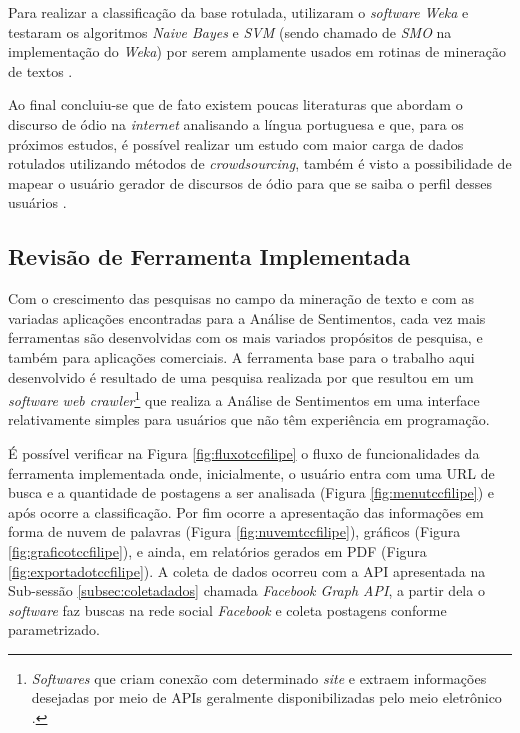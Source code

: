 Para realizar a classificação da base rotulada,  utilizaram o \textit{software} \textit{Weka} e testaram os algoritmos \textit{Naive Bayes} e \textit{SVM} (sendo chamado de \textit{SMO} na implementação do \textit{Weka}) por serem amplamente usados em rotinas de mineração de textos \cite{Pelle2017}. 

Ao final concluiu-se que de fato existem poucas literaturas que abordam o discurso de ódio na \textit{internet} analisando a língua portuguesa e que, para os próximos estudos, é possível realizar um estudo com maior carga de dados rotulados utilizando métodos de \textit{crowdsourcing}, também é visto a possibilidade de mapear o usuário gerador de discursos de ódio para que se saiba o perfil desses usuários \cite{Pelle2017}.

\subsection{Revisão de Ferramenta Implementada}
\label{sec:revisaoferramenta}
Com o crescimento das pesquisas no campo da mineração de texto e com as variadas aplicações encontradas para a Análise de Sentimentos, cada vez mais ferramentas são desenvolvidas com os mais variados propósitos de pesquisa, e também para aplicações comerciais. A ferramenta base para o trabalho aqui desenvolvido é resultado de uma pesquisa realizada por  que resultou em um \textit{software} \textit{web crawler}\footnote{ \textit{Softwares} que criam conexão com determinado \textit{site} e extraem informações desejadas por meio de APIs geralmente disponibilizadas pelo meio eletrônico \cite{Kumar2018}.} que realiza a Análise de Sentimentos em uma interface relativamente simples para usuários que não têm experiência em programação.

É possível verificar na Figura \ref{fig:fluxotccfilipe} o fluxo de funcionalidades da ferramenta implementada onde, inicialmente, o usuário entra com uma URL de busca e a quantidade de postagens a ser analisada (Figura \ref{fig:menutccfilipe}) e após ocorre a classificação. Por fim ocorre a apresentação das informações em forma de nuvem de palavras (Figura \ref{fig:nuvemtccfilipe}), gráficos (Figura \ref{fig:graficotccfilipe}), e ainda, em relatórios gerados em PDF (Figura \ref{fig:exportadotccfilipe}). A coleta de dados ocorreu com a API apresentada na Sub-sessão \ref{subsec:coletadados} chamada \textit{Facebook Graph API}, a partir dela o \textit{software} faz buscas na rede social \textit{Facebook} e coleta postagens conforme parametrizado.

